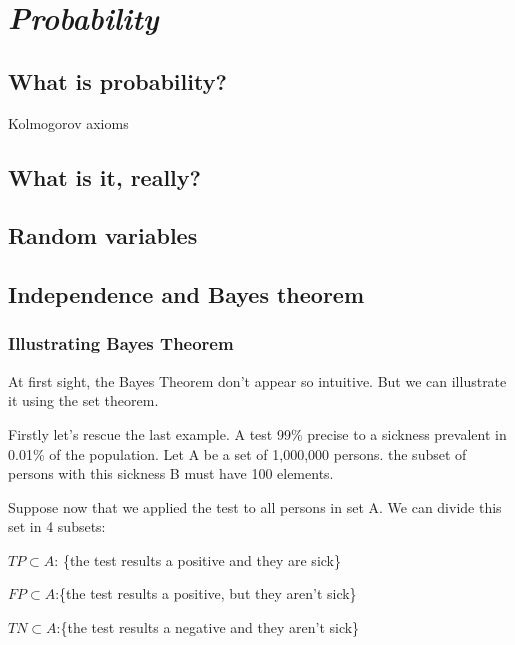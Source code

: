 \documentclass{book}
\begin{document}
\chapter{\emph{Probability}}

\label{probability}

\section{What is probability?}
Kolmogorov axioms

\section{What is it, really?}

\section{Random variables}

\section{Independence and Bayes theorem}
\subsection{Illustrating Bayes Theorem}

At first sight, the Bayes Theorem don't appear so intuitive. But we can illustrate it using the set theorem.

Firstly let's rescue the last example. A test 99\% precise to a sickness prevalent in 0.01\% of the population. Let A be a set of 1,000,000 persons. the subset of persons with this sickness B must have 100 elements.

Suppose now that we applied the test to all persons in set A. We can divide this set in 4 subsets:

$TP \subset A$: \{the test results a positive and they are sick\}

$FP \subset A$:\{the test results a positive, but they aren't sick\}

$TN \subset A$:\{the test results a negative and they aren't sick\}
\end{document}
